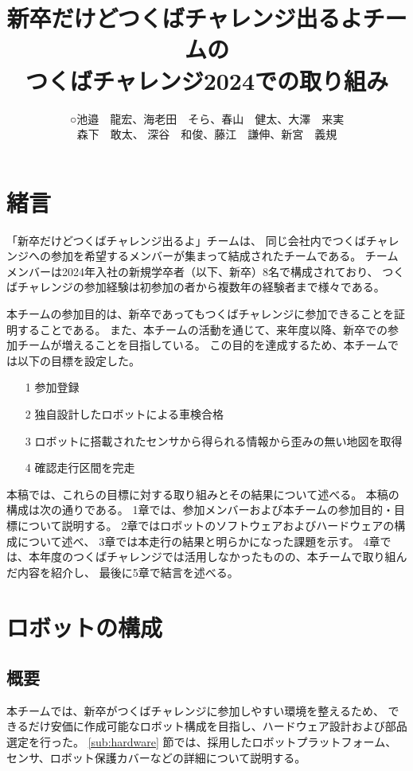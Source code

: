 \documentclass[twocolumn,9pt]{jsproceedings}
\title{新卒だけどつくばチャレンジ出るよチームの\\つくばチャレンジ2024での取り組み}
\author{○池邉　龍宏\authorrefmark{1}、海老田　そら\authorrefmark{1}、春山　健太\authorrefmark{1}、大澤　来実\authorrefmark{1}\\森下　敢太\authorrefmark{1}、
深谷　和俊\authorrefmark{1}、藤江　謙伸\authorrefmark{1}、新宮　義規\authorrefmark{1}}
\affiliation{新卒だけどつくばチャレンジ出るよ}
\begin{document}
\maketitle


\section{緒言}\label{sec:1}

「新卒だけどつくばチャレンジ出るよ」チームは、
同じ会社内でつくばチャレンジへの参加を希望するメンバーが集まって結成されたチームである。
チームメンバーは2024年入社の新規学卒者（以下、新卒）8名で構成されており、
つくばチャレンジの参加経験は初参加の者から複数年の経験者まで様々である。

本チームの参加目的は、新卒であってもつくばチャレンジに参加できることを証明することである。
また、本チームの活動を通じて、来年度以降、新卒での参加チームが増えることを目指している。
この目的を達成するため、本チームでは以下の目標を設定した。
\begin{itemize}
  \item[1] 参加登録
  \item[2] 独自設計したロボットによる車検合格
  \item[3] ロボットに搭載されたセンサから得られる情報から歪みの無い地図を取得
  \item[4] 確認走行区間を完走
\end{itemize}


本稿では、これらの目標に対する取り組みとその結果について述べる。
本稿の構成は次の通りである。
1章では、参加メンバーおよび本チームの参加目的・目標について説明する。
2章ではロボットのソフトウェアおよびハードウェアの構成について述べ、
3章では本走行の結果と明らかになった課題を示す。
4章では、本年度のつくばチャレンジでは活用しなかったものの、本チームで取り組んだ内容を紹介し、
最後に5章で結言を述べる。

\section{ロボットの構成}

\subsection{概要}
本チームでは、新卒がつくばチャレンジに参加しやすい環境を整えるため、
できるだけ安価に作成可能なロボット構成を目指し、ハードウェア設計および部品選定を行った。
\ref{sub:hardware} 節では、採用したロボットプラットフォーム、センサ、ロボット保護カバーなどの詳細について説明する。
\end{document}
